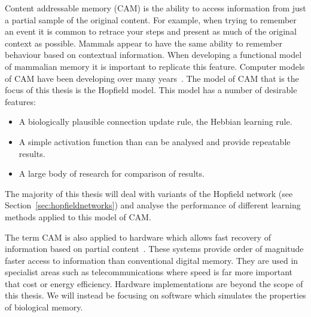 Content addressable memory (CAM) is the ability to access information from just a partial sample of the original content. For example, when trying to remember an event it is common to retrace your steps and present as much of the original context as possible.  Mammals appear to have the same ability to remember behaviour based on contextual information.  When developing a functional model of mammalian memory it is important to replicate this feature. Computer models of CAM have been developing over many years~\citep{Hanlon1966, Hopfield82, Kohonen1987, Pagiamtzis2006}. The model of CAM that is the focus of this thesis is the Hopfield model. This model has a number of desirable features:
\begin{itemize}
	\item A biologically plausible connection update rule, the Hebbian learning rule.
	\item A simple activation function than can be analysed and provide repeatable results.
	\item A large body of research for comparison of results.
\end{itemize}
The majority of this thesis will deal with variants of the Hopfield network (see Section~\ref{sec:hopfieldnetworks}) and analyse the performance of different learning methods applied to this model of CAM.

The term CAM is also applied to hardware which allows fast recovery of information based on partial content~\citep{Schultz1996}.  These systems provide order of magnitude faster access to information than conventional digital memory.  They are used in specialist areas such as telecommunications where speed is far more important that cost or energy efficiency.  Hardware implementations are beyond the scope of this thesis. We will instead be focusing on software which simulates the properties of biological memory.


